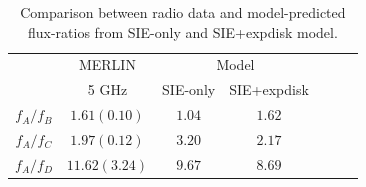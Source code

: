 \documentclass[useAMS,usenatbib]{mn2e}
\begin{document}




\begin{table}
 \centering
  \caption{Comparison between radio data \citep{K03} and model-predicted flux-ratios from SIE-only and SIE+expdisk model.}
  \begin{tabular}{@{}ccccccc}

\hline
	& MERLIN  & \multicolumn{2}{c}{Model}\\
		&5 GHz   & SIE-only & SIE+expdisk \\
\hline
$f_A/f_B$			&$1.61 (0.10)$ &$1.04$& $1.62$  \\ 
$f_A/f_C$		&$1.97 (0.12)$ 	 &$3.20$ & $2.17$ \\
$f_A/f_D$		&$11.62 (3.24)$  &$9.67$& $8.69$ \\

\hline
\end{tabular}

\medskip
\end{table}
\end{document}
